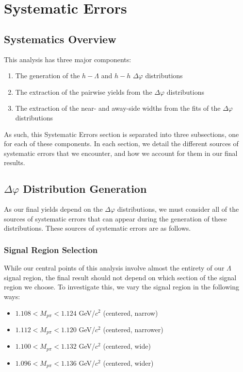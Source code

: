 \documentclass[ALICE,manyauthors]{ALICE_analysis_notes}
\begin{document}
\clearpage

\section{Systematic Errors}
\label{systematics}
\subsection{Systematics Overview}
This analysis has three major components:
\begin{enumerate}
\item The generation of the $h-\Lambda$ and $h-h$ $\Delta\varphi$ distributions
\item The extraction of the pairwise yields from the $\Delta\varphi$ distributions
\item The extraction of the near- and away-side widths from the fits of the $\Delta\varphi$ distributions
\end{enumerate}

As such, this Systematic Errors section is separated into three subsections, one for each of these components. In each section, we detail the different sources of systematic errors that we encounter, and how we account for them in our final results.


\subsection{$\Delta\varphi$ Distribution Generation}
\label{systematics_dphi}
As our final yields depend on the $\Delta\varphi$ distributions, we must consider all of the sources of systematic errors that can appear during the generation of these distributions. These sources of systematic errors are as follows.

\subsubsection{Signal Region Selection}
While our central points of this analysis involve almost the entirety of our $\Lambda$ signal region, the final result should not depend on which section of the signal region we choose. To investigate this, we vary the signal region in the following ways:

\begin{itemize}
\item $1.108 < M_{p\pi} < 1.124$ GeV/$c^2$ (centered, narrow)
\item $1.112 < M_{p\pi} < 1.120$ GeV/$c^2$ (centered, narrower)
\item $1.100 < M_{p\pi} < 1.132$ GeV/$c^2$ (centered, wide)
\item $1.096 < M_{p\pi} < 1.136$ GeV/$c^2$ (centered, wider)
\end{itemize}
\end{document}
